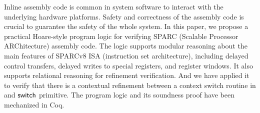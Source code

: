 Inline assembly code is common in system software to interact with
the underlying hardware platforms. Safety and correctness of the
assembly code is crucial to guarantee the safety of the whole
system. In this paper, we propose a practical Hoare-style program
logic for verifying SPARC (Scalable Processor ARChitecture) assembly code. The logic supports
modular reasoning about the main features of 
SPARCv8 ISA (instruction set architecture), including
delayed control transfers, delayed writes to special registers,
and register windows. 
It also supports relational reasoning for refinement 
verification. And we have applied it to verify that 
there is a contextual refinement 
between a context switch routine in \sparc{} and 
$\mathsf{switch}{}$ primitive. The program logic and its soundness proof 
have been mechanized in Coq. 
